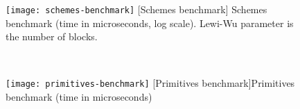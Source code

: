 \begin{figure}[!ht]
	\centering
	\begin{minipage}[t]{0.48\columnwidth}
		\captionsetup[figure]{justification=centering}
		\centering
		\texttt{[image: schemes-benchmark]}
		[Schemes benchmark]{
			Schemes benchmark (time in microseconds, log scale).
			Lewi-Wu parameter is the number of blocks.
		}%
		\label{figure:benchmarks:schemes}
	\end{minipage}
	~ %
	\begin{minipage}[t]{0.48\columnwidth}
		\captionsetup[figure]{justification=centering}
		\centering
		\texttt{[image: primitives-benchmark]}
		[Primitives benchmark]{Primitives benchmark (time in microseconds)}%
		\label{figure:benchmarks:primitives}
	\end{minipage}
\end{figure}
